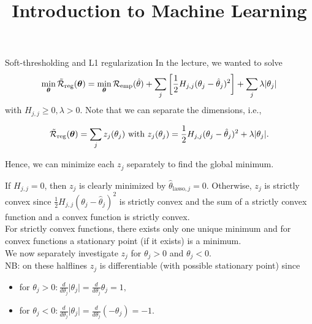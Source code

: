 \documentclass[11pt,compress,t,notes=noshow, xcolor=table]{beamer}
\title{Introduction to Machine Learning}
\begin{document}




\begin{vbframe}{Soft-thresholding and L1 regularization}
In the lecture, we wanted to solve
     \[
      \min_{\bm{\theta}} \mathcal{\tilde R}_{\text{reg}}(\bm{\theta}) =  \min_{\bm{\theta}}\mathcal{R}_{\text{emp}}(\hat{\theta}) + \sum_j \left[ \frac{1}{2} H_{j,j} (\theta_j - \hat{\theta}_j)^2 \right] + \sum_j \lambda |\theta_j|
      \]
with $H_{j,j} \geq 0, \lambda > 0$. Note that we can separate the dimensions, i.e.,

\[\mathcal{\tilde R}_{\text{reg}}(\bm{\theta}) = \sum_j z_j(\theta_j) \text{ with } z_j(\theta_j) = \frac{1}{2} H_{j,j} (\theta_j - \hat{\theta}_j)^2 + \lambda |\theta_j|.\]
      
Hence, we can minimize each $z_j$ separately to find the global minimum. \\
\lz

If $H_{j,j} = 0$, then $z_j$ is clearly minimized by $\hat{\theta}_{\text{lasso},j} = 0.$ Otherwise, $z_j$ is strictly convex since $\frac{1}{2} H_{j,j} (\theta_j - \hat{\theta}_j)^2$ is strictly convex and the sum of a strictly convex function and a convex function is strictly convex. \\


\framebreak
For strictly convex functions, there exists only one unique minimum and for convex functions a stationary point (if it exists) is a minimum. \\
\lz 
We now separately investigate $z_j$ for $\theta_j > 0$ and $\theta_j < 0.$\\
\lz
NB: on these halflines $z_j$ is differentiable (with possible stationary point) since
\begin{itemize}
    \item for $\theta_j > 0: \frac{d}{d\theta_j}\vert \theta_j\vert = \frac{d}{d\theta_j}\theta_j = 1,$
    \item for $\theta_j < 0: \frac{d}{d\theta_j}\vert \theta_j\vert = \frac{d}{d\theta_j}\left(-\theta_j\right) = -1$.
\end{itemize}


\end{vbframe}
\end{document}

